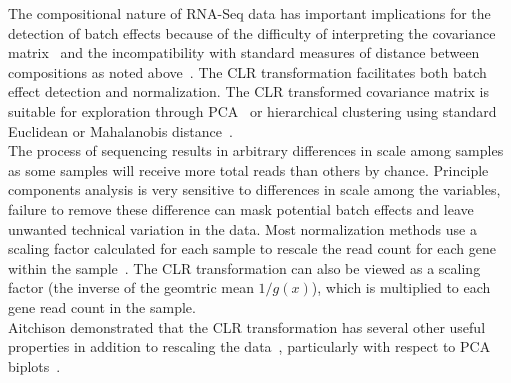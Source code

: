 \documentclass{article}\usepackage[]{graphicx}\usepackage[]{color}
\theoremstyle{definition}
\begin{document}
The compositional nature of RNA-Seq data has important implications for the detection of batch effects because of the difficulty of interpreting the covariance matrix~\cite{Aitchison1986} and the incompatibility with standard measures of distance between compositions as noted above~\cite{Martin-Fernandez1998}.  The CLR transformation facilitates both batch effect detection and normalization.  The CLR transformed covariance matrix is suitable for exploration through PCA~\cite{Aitchison2002} or hierarchical clustering using standard Euclidean or Mahalanobis distance~\cite{Martin-Fernandez1998}.  \\

The process of sequencing results in arbitrary differences in scale among samples as some samples will receive more total reads than others by chance. Principle components analysis is very sensitive to differences in scale among the variables, failure to remove these difference can mask potential batch effects and leave unwanted technical variation in the data.  Most normalization methods use a scaling factor calculated for each sample to rescale the read count for each gene within the sample~\cite{Dillies2013}.  The CLR transformation can also be viewed as a scaling factor (the inverse of the geomtric mean $1/g(x)$), which is multiplied to each gene read count in the sample.\\

Aitchison demonstrated that the CLR transformation has several other useful properties in addition to rescaling the data~\cite{Aitchison1986}, particularly with respect to PCA biplots~\cite{Aitchison2002}.  \\






\newpage

\printbibliography
\end{document}
